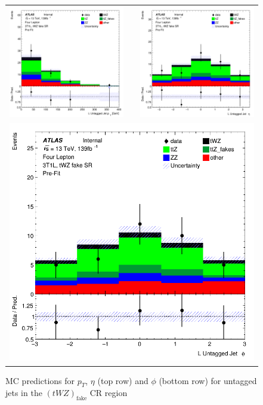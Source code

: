 \begin{figure}[htbp]
\centering
  \begin{tabular}{ccc}

    \includegraphics[width=.2\textwidth]{figures/PreFitPlots/lep4_tWZ_3T1L_L_UntaggedJet_pt} & &
    \includegraphics[width=.2\textwidth]{figures/PreFitPlots/lep4_tWZ_3T1L_L_UntaggedJet_eta} \\
    \multicolumn{3}{c}{\includegraphics[width=.2\textwidth]{figures/PreFitPlots/lep4_tWZ_3T1L_L_UntaggedJet_phi}}
  \end{tabular}
      \caption{MC predictions for $p_{T}$, $\eta$ (top row) and $\phi$ (bottom row) for untagged jets in the $(tWZ)_{\text{fake}}$ CR region }
  \label{fig:4lep-3T1L-CR-UntaggedjetPlots}
\end{figure}



